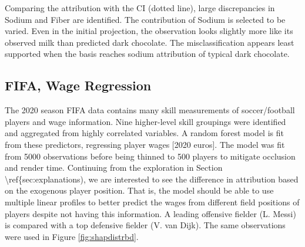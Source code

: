 \documentclass[
]{jss}
\begin{document}
Comparing the attribution with the CI (dotted line), large discrepancies
in Sodium and Fiber are identified. The contribution of Sodium is
selected to be varied. Even in the initial projection, the observation
looks slightly more like its observed milk than predicted dark
chocolate. The misclassification appears least supported when the basis
reaches sodium attribution of typical dark chocolate.

\hypertarget{fifa-wage-regression}{%
\subsection{FIFA, Wage Regression}\label{fifa-wage-regression}}

The 2020 season FIFA data \citep{leone_fifa_2020, biecek_dalex_2018}
contains many skill measurements of soccer/football players and wage
information. Nine higher-level skill groupings were identified and
aggregated from highly correlated variables. A random forest model is
fit from these predictors, regressing player wages {[}2020 euros{]}. The
model was fit from 5000 observations before being thinned to 500 players
to mitigate occlusion and render time. Continuing from the exploration
in Section \textbackslash ref\{sec:explanations), we are interested to
see the difference in attribution based on the exogenous player
position. That is, the model should be able to use multiple linear
profiles to better predict the wages from different field positions of
players despite not having this information. A leading offensive fielder
(L. Messi) is compared with a top defensive fielder (V. van Dijk). The
same observations were used in Figure \ref{fig:shapdistrbd}.
\end{document}
